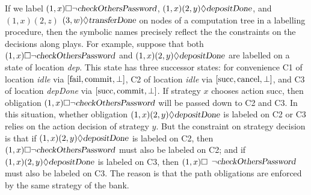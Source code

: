 If we label $(1,x) \Box \neg \mbox{\sl checkOthersPassword}$, $(1,x)(2,y)\Diamond \mbox{\sl depositDone}$, and $(1,x)(2,z)$ $(3,w)\Diamond\mbox{\sl transferDone}$ on nodes of a computation tree in a labelling procedure, then the symbolic names precisely reflect the the constraints on the decisions along plays. 
For example, suppose that both $(1,x) \Box \neg \mbox{\sl checkOthersPassword}$ and $(1,x)(2,y)\Diamond \mbox{\sl depositDone}$ are labelled on a state of location {\em dep}. 
This state has three successor states: for convenience 
C1 of location {\em idle} via $[\mbox{\rm fail},\mbox{\rm commit},\perp]$, 
C2 of location {\em idle} via $[\mbox{\rm succ}, \mbox{\rm cancel}, \perp]$, and 
C3 of location {\em depDone} via $[\mbox{\rm succ}, \mbox{\rm commit}, \perp]$.  
If strategy $x$ chooses action succ, then obligation $(1,x) \Box \neg \mbox{\sl checkOthersPassword}$ will be passed down to C2 and C3.  
In this situation, whether obligation $(1,x)(2,y)\Diamond \mbox{\sl depositDone}$ is labeled on C2 or C3 relies on the action decision of strategy $y$.  
But the constraint on strategy decision is that if $(1,x)(2,y)\Diamond \mbox{\sl depositDone}$ is labeled on C2, then $(1,x) \Box \neg \mbox{\sl checkOthersPassword}$ must also be labeled on C2; and if  $(1,x)(2,y)\Diamond \mbox{\sl depositDone}$ is labeled on C3, then $(1,x) \Box$ $\neg \mbox{\sl checkOthersPassword}$ must also be labeled on C3.  
The reason is that the path obligations are enforced by the same strategy of the bank.  

